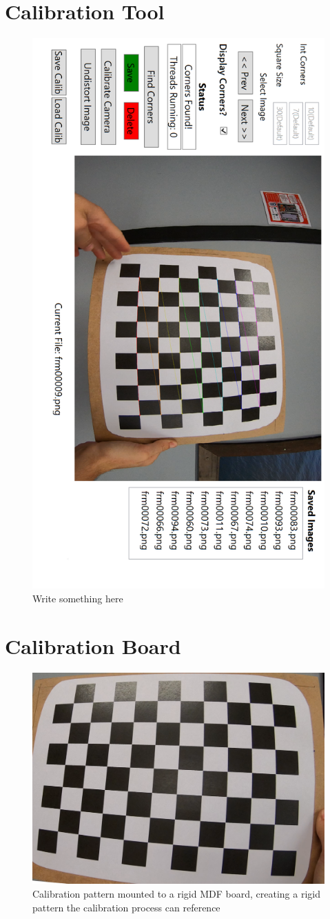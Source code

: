 \documentclass{UoNMCHA}
\numberwithin{equation}{section}
\begin{document}
\section{Calibration Tool}\label{app:calibrationTool}
\begin{figure}[ht]
    \begin{center}
        \includegraphics[width=.5\linewidth]{Figures/Calibration_Tool}
        \caption{Write something here}
        \label{fig:Calibration_Tool}
    \end{center}
\end{figure}
\newpage
\section{Calibration Board}\label{app:calibrationBoard}
\begin{figure}[ht]
    \begin{center}
        \includegraphics[width=.6\linewidth]{Figures/calibrationBoard}%
        \caption{Calibration pattern mounted to a rigid MDF board, creating a rigid pattern the calibration process can reference}
        \label{fig:UnityEnvironment}
    \end{center}
\end{figure}
\newpage
\end{document}
